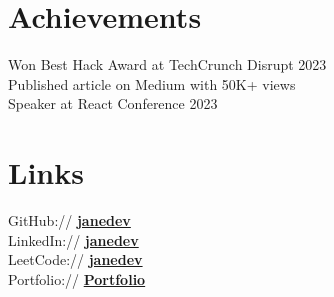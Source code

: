 \documentclass[]{deedy-resume-reversed}
\begin{document}
\begin{minipage}[t]{0.33\textwidth}
\section{Achievements}
Won Best Hack Award at TechCrunch Disrupt 2023 \\
Published article on Medium with 50K+ views \\
Speaker at React Conference 2023 \\
\sectionsep


\section{Links}
GitHub:// \href{https://github.com/janedev}{\bf janedev} \\
LinkedIn:// \href{https://linkedin.com/in/janedev}{\bf janedev} \\
LeetCode:// \href{https://leetcode.com/janedev}{\bf janedev} \\
Portfolio:// \href{https://janedev.com}{\bf Portfolio} \\
\sectionsep



\end{minipage}
\end{document}

